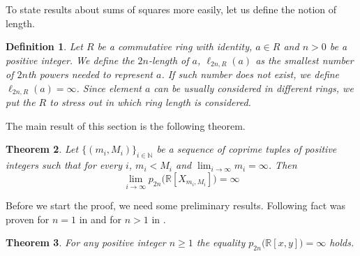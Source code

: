 \documentclass[12pt,reqno]{amsart}   	%
\newtheorem{thm}{Theorem}[section]
\newtheorem{df}[thm]{Definition}
\theoremstyle{remark}
\newcommand{\R}{\mathbb{R}}
\newcommand{\N}{\mathbb{N}}
\begin{document}
To state results about sums of squares more easily, let us define the notion of length.

\begin{df}
    Let $R$ be a commutative ring with identity, $a \in R$ and $n>0$ be a positive integer. We define the $2n$-length of $a$, $\ell_{2n,R}(a)$ as the smallest number of $2n$th powers needed to represent $a$. If such number does not exist, we define $\ell_{2n,R}(a)=\infty$. Since element $a$ can be usually considered in different rings, we put the $R$ to stress out in which ring length is considered.
\end{df}

The main result of this section is the following theorem.


\begin{thm} \label{THM: podchodzenie krzywymi do płaszczyzny dla p_2n}
    Let     $  {
   \big\{
    (m_i,M_i)
    \big\}
    }_{i \in \N}    $
     be a sequence of coprime tuples of positive integers such that for every $i$, $m_i < M_i$ and  $\lim_{i \rightarrow \infty} m_i = \infty$. Then      $$
    \lim_{i \rightarrow \infty} p_{2n}
        \big(
        \R [X_{m_i,M_i}]
        \big)
    = \infty
    $$
\end{thm}



Before we start the proof, we need some preliminary results.  Following fact was proven for $n=1$ in \cite[Theorem 4.1]{cldr1982} and for $n>1$ in \cite[Theorem 2.2]{kv2023}.
\begin{thm} \label{THM: p_2n dla R^2}
    For any positive integer $n\geq1$ the equality $p_{2n}\big(\R[x,y]\big) = \infty$ holds.
\end{thm}
\end{document}
